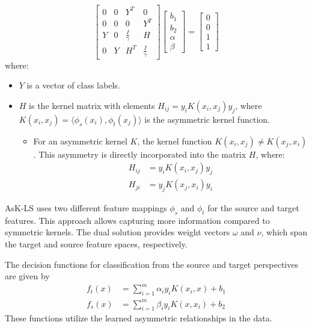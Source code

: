 \[
\begin{bmatrix}
0 & 0 & Y^T & 0 \\
0 & 0 & 0 & Y^T \\
Y & 0 & \frac{I}{\gamma} & H \\
0 & Y & H^T & \frac{I}{\gamma}
\end{bmatrix}
\begin{bmatrix}
b_1 \\
b_2 \\
\alpha \\
\beta
\end{bmatrix}
=
\begin{bmatrix}
0 \\
0 \\
1 \\
1
\end{bmatrix}
\]
where:
\begin{itemize}
	\item \( Y \) is a vector of class labels.
	\item \( H \) is the kernel matrix with elements \( H_{ij} = y_i K(x_i, x_j) y_j \), where \( K(x_i, x_j) = \langle \phi_s(x_i), \phi_t(x_j) \rangle \) is the asymmetric kernel function.
		\begin{itemize}
			\item For an asymmetric kernel \( K \), the kernel function \( K(x_i, x_j) \neq K(x_j, x_i) \). This asymmetry is directly incorporated into the matrix \( H \), where:
				\begin{align*}
					H_{ij} &= y_i K(x_i, x_j) y_j \\
					H_{ji} &= y_j K(x_j, x_i) y_i
				\end{align*}
		\end{itemize}
\end{itemize}

AsK-LS uses two different feature mappings \( \phi_s \) and \( \phi_t \) for the source and target features. This approach allows capturing more information compared to symmetric kernels. The dual solution provides weight vectors \( \omega \) and \( \nu \), which span the target and source feature spaces, respectively.

The decision functions for classification from the source and target perspectives are given by
\begin{align*}
	f_t(x) &= \sum_{i=1}^m \alpha_i y_i K(x_i, x) + b_1\\
	f_s(x) &= \sum_{i=1}^m \beta_i y_i K(x, x_i) + b_2
\end{align*}
These functions utilize the learned asymmetric relationships in the data.


